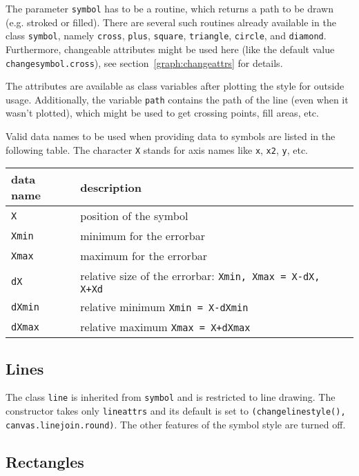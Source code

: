 The parameter \verb|symbol| has to be a routine, which returns a path to
be drawn (e.g. stroked or filled). There are several such routines
already available in the class \verb|symbol|, namely \verb|cross|,
\verb|plus|, \verb|square|, \verb|triangle|, \verb|circle|, and
\verb|diamond|. Furthermore, changeable attributes might be used here
(like the default value \verb|changesymbol.cross|), see
section~\ref{graph:changeattrs} for details.

The attributes are available as class variables after plotting the
style for outside usage. Additionally, the variable \verb|path|
contains the path of the line (even when it wasn't plotted), which
might be used to get crossing points, fill areas, etc.

Valid data names to be used when providing data to symbols are listed
in the following table. The character \verb|X| stands for axis names
like \verb|x|, \verb|x2|, \verb|y|, etc.

\begin{center}
\begin{tabular}{ll}
data name&description\\
\hline
\texttt{X}&position of the symbol\\
\texttt{Xmin}&minimum for the errorbar\\
\texttt{Xmax}&maximum for the errorbar\\
\texttt{dX}&relative size of the errorbar: \texttt{Xmin, Xmax = X-dX, X+Xd}\\
\texttt{dXmin}&relative minimum \texttt{Xmin = X-dXmin}\\
\texttt{dXmax}&relative maximum \texttt{Xmax = X+dXmax}\\
\end{tabular}
\end{center}

\subsection{Lines}

The class \verb|line| is inherited from \verb|symbol| and is restricted
to line drawing. The constructor takes only \verb|lineattrs| and its
default is set to \verb|(changelinestyle(), canvas.linejoin.round)|.
The other features of the symbol style are turned off.

\subsection{Rectangles}

